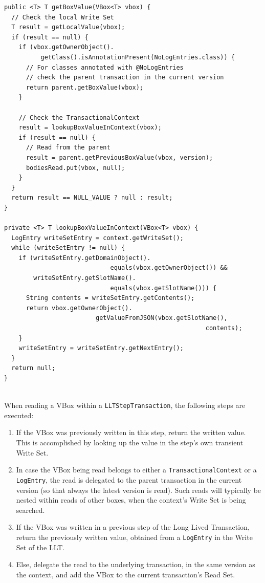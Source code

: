 \begin{lstlisting}[caption={Reading a VBox within a Context},float]
public <T> T getBoxValue(VBox<T> vbox) {
  // Check the local Write Set
  T result = getLocalValue(vbox);
  if (result == null) {
    if (vbox.getOwnerObject().
          getClass().isAnnotationPresent(NoLogEntries.class)) {
      // For classes annotated with @NoLogEntries
      // check the parent transaction in the current version
      return parent.getBoxValue(vbox);
    }

    // Check the TransactionalContext
    result = lookupBoxValueInContext(vbox);
    if (result == null) {
      // Read from the parent
      result = parent.getPreviousBoxValue(vbox, version);
      bodiesRead.put(vbox, null);
    }
  }
  return result == NULL_VALUE ? null : result;
}

private <T> T lookupBoxValueInContext(VBox<T> vbox) {
  LogEntry writeSetEntry = context.getWriteSet();
  while (writeSetEntry != null) {
    if (writeSetEntry.getDomainObject().
                             equals(vbox.getOwnerObject()) &&
        writeSetEntry.getSlotName().
                             equals(vbox.getSlotName())) {
      String contents = writeSetEntry.getContents();
      return vbox.getOwnerObject().
                         getValueFromJSON(vbox.getSlotName(),
                                                       contents);
    }
    writeSetEntry = writeSetEntry.getNextEntry();
  }
  return null;
}


\end{lstlisting}

When reading a VBox within a \texttt{LLTStepTransaction}, the following
steps are executed:

\begin{enumerate}

\item If the VBox was previously written in this step, return the
  written value. This is accomplished by looking up the value in the
  step's own transient Write Set.

\item In case the VBox being read belongs to either a
  \texttt{TransactionalContext} or a \texttt{LogEntry}, the read is
  delegated to the parent transaction in the current version (so that
  always the latest version is read). Such reads will typically be
  nested within reads of other boxes, when the context's Write Set is
  being searched.

\item If the VBox was written in a previous step of the Long Lived
  Transaction, return the previously written value, obtained from a
  \texttt{LogEntry} in the Write Set of the LLT.

\item Else, delegate the read to the underlying transaction, in the
  same version as the context, and add the VBox to the current
  transaction's Read Set.

\end{enumerate}

